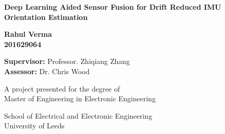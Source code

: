 \begin{titlepage}
    \begin{center}
        \vspace*{1cm}

        \Huge
        \textbf{Deep Learning Aided Sensor Fusion for Drift Reduced IMU Orientation Estimation}

        \vspace{1.5 cm}

        \LARGE
        \textbf{Rahul Verma} \\
        \textbf{201629064}

        \vspace{1.5 cm}

        \Large
        \textbf{Supervisor:} 
        Professor. Zhiqiang Zhang \\
        \textbf{Assessor:}
        Dr. Chris Wood


        \vfill

        A project presented for the degree of\\
        Master of Engineering in Electronic Engineering

        \vspace{0.8cm}
        
        \Large
        School of Electrical and Electronic Engineering\\
        University of Leeds\\



    \end{center}
    
\end{titlepage}